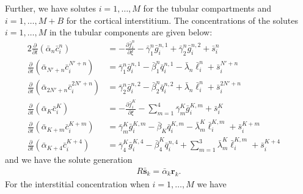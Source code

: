 \documentclass{article}
\begin{document}
Further, we have solutes $i=1,\dots,M$ for the tubular compartments and $i=1,\dots,M+B$ for the cortical interstitium.
The concentrations of the solutes $i=1,\dots,M$ in the tubular components are given below:
\begin{alignat}{2}
    \frac{\partial }{\partial t}(\bar{\alpha}_n\bar{c}_i^n) &= -\frac{\partial \bar{f}_i^n}{\partial \xi}-\bar{\gamma}_1^n\bar{g}_i^{n,1}+\bar{\gamma}_2^n\bar{g}_i^{n,2}+\bar{s}_i^{n} \qquad \   \\%
    \frac{\partial }{\partial t}(\bar{\alpha}_{N'+n}\bar{c}_i^{N'+n}) &= \bar{\gamma}_1^n\bar{g}_i^{n,1}-\bar{\beta}_1^n\bar{q}_i^{n,1}-\bar{\lambda}_n\bar{\ell}_i^n+\bar{s}_i^{N'+n} \quad \, \\%
    \frac{\partial }{\partial t}(\bar{\alpha}_{2N'+n} \bar{c}_i^{2N'+n}) &= \bar{\gamma}_2^n\bar{g}_i^{n,2}-\bar{\beta}_2^n\bar{q}_i^{n,2}+\bar{\lambda}_n\bar{\ell}_i^n+\bar{s}_i^{2N'+n}\ \ \\%
    \frac{\partial }{\partial t}(\bar{\alpha}_K\bar{c}_i^K) &= -\frac{\partial \bar{f}_i^K}{\partial \xi}-\sum_{m=1}^4\bar{\gamma}_m^K\bar{g}_i^{K,m}+\bar{s}_i^K \qquad  \\%
    \frac{\partial }{\partial t}(\bar{\alpha}_{K+m}\bar{c}_i^{K+m}) &= \bar{\gamma}_m^K\bar{g}_i^{K,m}-\bar{\beta}_K\bar{q}_i^{K,m}-\bar{\lambda}_m^K\bar{\ell}_i^{K,m}+\bar{s}_i^{K+m} \quad  \\%
    \frac{\partial }{\partial t}(\bar{\alpha}_{K+4} \bar{c}_i^{K+4}) &= \bar{\gamma}_4^K\bar{g}_i^{K,4}-\bar{\beta}_4^K\bar{q}_i^{n,4}+\sum_{m=1}^3\bar{\lambda}_m^K\bar{\ell}_i^{K,m}+\bar{s}_i^{K+4}\quad \,  %
\end{alignat}
and we have the solute generation
\begin{align}
    R\bar{\mathbf{s}}_k = \bar{\alpha}_k \mathbf{r}_k.
\end{align}
For the interstitial concentration when $i=1,\dots,M$ we have
\end{document}
